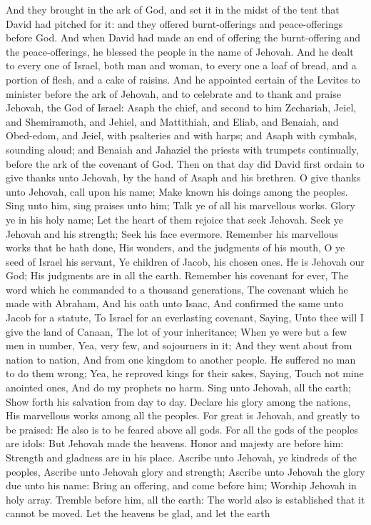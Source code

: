 And they brought in the ark of God, and set it in the midst of the tent that David had pitched for it: and they offered burnt-offerings and peace-offerings before God. And when David had made an end of offering the burnt-offering and the peace-offerings, he blessed the people in the name of Jehovah. And he dealt to every one of Israel, both man and woman, to every one a loaf of bread, and a portion of flesh, and a cake of raisins.  And he appointed certain of the Levites to minister before the ark of Jehovah, and to celebrate and to thank and praise Jehovah, the God of Israel: Asaph the chief, and second to him Zechariah, Jeiel, and Shemiramoth, and Jehiel, and Mattithiah, and Eliab, and Benaiah, and Obed-edom, and Jeiel, with psalteries and with harps; and Asaph with cymbals, sounding aloud; and Benaiah and Jahaziel the priests with trumpets continually, before the ark of the covenant of God.  Then on that day did David first ordain to give thanks unto Jehovah, by the hand of Asaph and his brethren.  O give thanks unto Jehovah, call upon his name; Make known his doings among the peoples.  Sing unto him, sing praises unto him; Talk ye of all his marvellous works.  Glory ye in his holy name; Let the heart of them rejoice that seek Jehovah.  Seek ye Jehovah and his strength; Seek his face evermore.  Remember his marvellous works that he hath done, His wonders, and the judgments of his mouth,  O ye seed of Israel his servant, Ye children of Jacob, his chosen ones.  He is Jehovah our God; His judgments are in all the earth.  Remember his covenant for ever, The word which he commanded to a thousand generations,  The covenant which he made with Abraham, And his oath unto Isaac,  And confirmed the same unto Jacob for a statute, To Israel for an everlasting covenant,  Saying, Unto thee will I give the land of Canaan, The lot of your inheritance;  When ye were but a few men in number, Yea, very few, and sojourners in it;  And they went about from nation to nation, And from one kingdom to another people.  He suffered no man to do them wrong; Yea, he reproved kings for their sakes,  Saying, Touch not mine anointed ones, And do my prophets no harm.  Sing unto Jehovah, all the earth; Show forth his salvation from day to day.  Declare his glory among the nations, His marvellous works among all the peoples.  For great is Jehovah, and greatly to be praised: He also is to be feared above all gods.  For all the gods of the peoples are idols: But Jehovah made the heavens.  Honor and majesty are before him: Strength and gladness are in his place.  Ascribe unto Jehovah, ye kindreds of the peoples, Ascribe unto Jehovah glory and strength;  Ascribe unto Jehovah the glory due unto his name: Bring an offering, and come before him; Worship Jehovah in holy array.  Tremble before him, all the earth: The world also is established that it cannot be moved.  Let the heavens be glad, and let the earth 